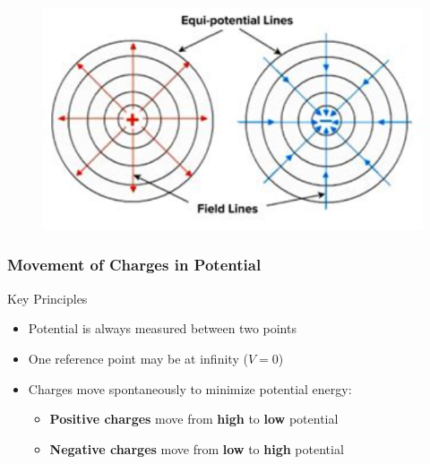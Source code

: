 \documentclass{beamer}
\begin{document}
\begin{frame}
    
   \begin{figure}
       \centering
       \includegraphics[width=1\linewidth]{phys11-electrostatics-equipotential-field-lines.png}
   \end{figure}
    
\end{frame}

\begin{frame}
    \frametitle{Movement of Charges in Potential}
    \begin{block}{Key Principles}
        \begin{itemize}
            \item Potential is always measured between two points
            \item One reference point may be at infinity ($V = 0$)
            \item Charges move spontaneously to minimize potential energy:
                \begin{itemize}
                    \item \textbf{Positive charges} move from \textbf{high} to \textbf{low} potential
                    \item \textbf{Negative charges} move from \textbf{low} to \textbf{high} potential
                \end{itemize}
        \end{itemize}
    \end{block}
    \end{frame}
\end{document}
